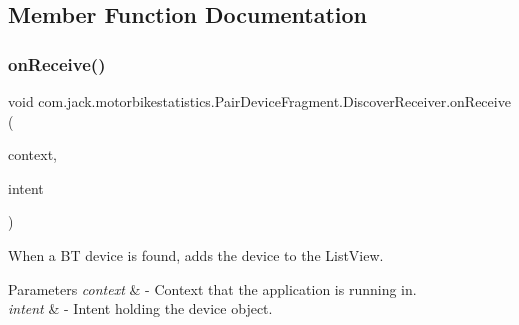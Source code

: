 \subsection{Member Function Documentation}
\mbox{\label{classcom_1_1jack_1_1motorbikestatistics_1_1_pair_device_fragment_1_1_discover_receiver_a2581f3c35ac5161b0ee10dfa4a94d05b}} 
\subsubsection{\texorpdfstring{on\+Receive()}{onReceive()}}
{\footnotesize\ttfamily void com.\+jack.\+motorbikestatistics.\+Pair\+Device\+Fragment.\+Discover\+Receiver.\+on\+Receive (\begin{DoxyParamCaption}\item[{Context}]{context,  }\item[{Intent}]{intent }\end{DoxyParamCaption})\hspace{0.3cm}{\ttfamily [inline]}}



When a BT device is found, adds the device to the List\+View. 


\begin{DoxyParams}{Parameters}
{\em context} & -\/ Context that the application is running in. \\
\hline
{\em intent} & -\/ Intent holding the device object. \\
\hline
\end{DoxyParams}

